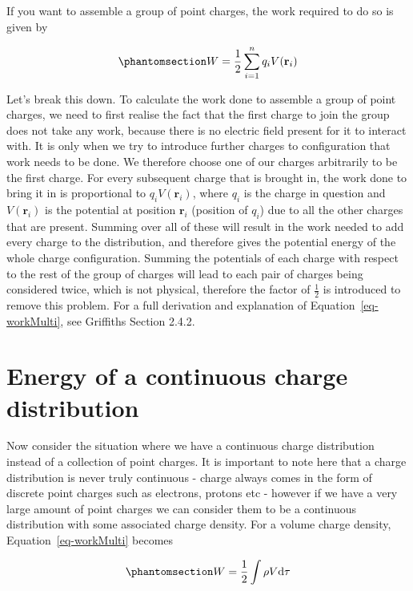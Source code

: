 \documentclass[
  letterpaper,
  DIV=11,
  numbers=noendperiod]{scrreprt}
\begin{document}
If you want to assemble a group of point charges, the work required to
do so is given by

\begin{equation}\phantomsection\label{eq-workMulti}{ W = \frac{1}{2} \sum_{i=1}^n q_i V(\mathrm{\mathbf{r}}_i) }\end{equation}

Let's break this down. To calculate the work done to assemble a group of
point charges, we need to first realise the fact that the first charge
to join the group does not take any work, because there is no electric
field present for it to interact with. It is only when we try to
introduce further charges to configuration that work needs to be done.
We therefore choose one of our charges arbitrarily to be the first
charge. For every subsequent charge that is brought in, the work done to
bring it in is proportional to \(q_i V(\mathrm{\mathbf{r}}_i)\), where
\(q_i\) is the charge in question and \(V(\mathrm{\mathbf{r}}_i)\) is
the potential at position \(\mathrm{\mathbf{r}}_i\) (position of
\(q_i\)) due to all the other charges that are present. Summing over all
of these will result in the work needed to add every charge to the
distribution, and therefore gives the potential energy of the whole
charge configuration. Summing the potentials of each charge with respect
to the rest of the group of charges will lead to each pair of charges
being considered twice, which is not physical, therefore the factor of
\(\frac{1}{2}\) is introduced to remove this problem. For a full
derivation and explanation of Equation~\ref{eq-workMulti}, see Griffiths
Section 2.4.2.

\section{Energy of a continuous charge
distribution}\label{energy-of-a-continuous-charge-distribution}

Now consider the situation where we have a continuous charge
distribution instead of a collection of point charges. It is important
to note here that a charge distribution is never truly continuous -
charge always comes in the form of discrete point charges such as
electrons, protons etc - however if we have a very large amount of point
charges we can consider them to be a continuous distribution with some
associated charge density. For a volume charge density,
Equation~\ref{eq-workMulti} becomes

\begin{equation}\phantomsection\label{eq-cont1}{ W = \frac{1}{2}\int \rho V \mathrm{d} \tau}\end{equation}
\end{document}
